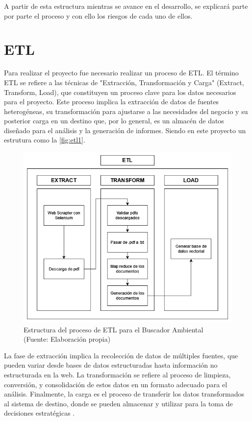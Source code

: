 A partir de esta estructura mientras se avance en el desarrollo, se explicará parte por parte el proceso y con ello los riesgos de cada uno de ellos.



\section{ETL}


Para realizar el proyecto fue necesario realizar un proceso de ETL. El término ETL se refiere a las técnicas de "Extracción, 
Transformación y Carga" (Extract, Transform, Load), que constituyen un proceso clave para los datos necesarios para el proyecto. 
Este proceso implica la extracción de datos de fuentes heterogéneas, su transformación para ajustarse a las necesidades del 
negocio y su posterior carga en un destino que, por lo general, es un almacén de datos diseñado para el análisis y la generación 
de informes\cite{ETL1}. Siendo en este proyecto un estrutura como la \autoref{fig:etl1}.

\begin{figure}[ht!]
    \centering
    \includegraphics[width=.7\textwidth]{figures/huemulETL.png}
    \caption[Estructura del proceso de ETL para el Buscador Ambiental]{Estructura del proceso de ETL para el Buscador Ambiental\\
    {\scriptsize (Fuente: Elaboración propia)}}
    \label{fig:etl1}
\end{figure}
    

La fase de extracción implica la recolección de datos de múltiples fuentes, que pueden variar desde bases de datos 
estructuradas hasta información no estructurada en la web. La transformación se refiere al proceso de limpieza, conversión, 
y consolidación de estos datos en un formato adecuado para el análisis. Finalmente, la carga es el proceso de transferir 
los datos transformados al sistema de destino, donde se pueden almacenar y utilizar para la toma de decisiones estratégicas 
\cite{ETL1}.

